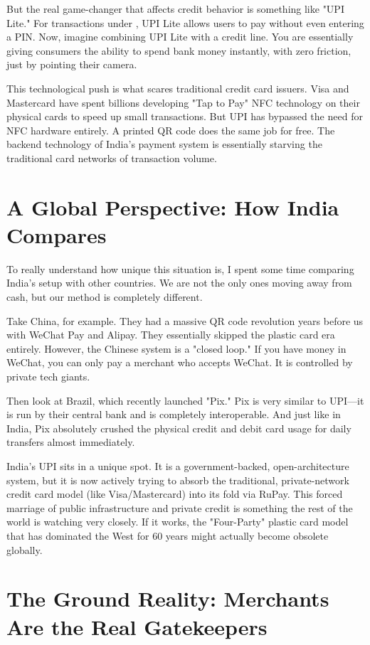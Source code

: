 But the real game-changer that affects credit behavior is something like "UPI Lite." For transactions under , UPI Lite allows users to pay without even entering a PIN. Now, imagine combining UPI Lite with a credit line. You are essentially giving consumers the ability to spend bank money instantly, with zero friction, just by pointing their camera.

This technological push is what scares traditional credit card issuers. Visa and Mastercard have spent billions developing "Tap to Pay" NFC technology on their physical cards to speed up small transactions. But UPI has bypassed the need for NFC hardware entirely. A printed QR code does the same job for free. The backend technology of India's payment system is essentially starving the traditional card networks of transaction volume.

\section{A Global Perspective: How India Compares}

To really understand how unique this situation is, I spent some time comparing India's setup with other countries. We are not the only ones moving away from cash, but our method is completely different.

Take China, for example. They had a massive QR code revolution years before us with WeChat Pay and Alipay. They essentially skipped the plastic card era entirely. However, the Chinese system is a "closed loop." If you have money in WeChat, you can only pay a merchant who accepts WeChat. It is controlled by private tech giants.

Then look at Brazil, which recently launched "Pix." Pix is very similar to UPI---it is run by their central bank and is completely interoperable. And just like in India, Pix absolutely crushed the physical credit and debit card usage for daily transfers almost immediately.

India's UPI sits in a unique spot. It is a government-backed, open-architecture system, but it is now actively trying to absorb the traditional, private-network credit card model (like Visa/Mastercard) into its fold via RuPay. This forced marriage of public infrastructure and private credit is something the rest of the world is watching very closely. If it works, the "Four-Party" plastic card model that has dominated the West for 60 years might actually become obsolete globally.

\section{The Ground Reality: Merchants Are the Real Gatekeepers}

